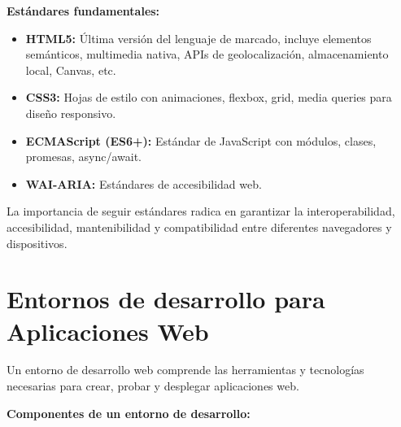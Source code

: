 \documentclass[12pt,letterpaper]{article}
\begin{document}
\textbf{Est\'andares fundamentales:}
\begin{itemize}
    \item \textbf{HTML5:} \'Ultima versi\'on del lenguaje de marcado, incluye elementos sem\'anticos, multimedia nativa, APIs de geolocalizaci\'on, almacenamiento local, Canvas, etc.
    \item \textbf{CSS3:} Hojas de estilo con animaciones, flexbox, grid, media queries para dise\~no responsivo.
    \item \textbf{ECMAScript (ES6+):} Est\'andar de JavaScript con m\'odulos, clases, promesas, async/await.
    \item \textbf{WAI-ARIA:} Est\'andares de accesibilidad web.
\end{itemize}

La importancia de seguir est\'andares radica en garantizar la interoperabilidad, accesibilidad, mantenibilidad y compatibilidad entre diferentes navegadores y dispositivos.

\section{Entornos de desarrollo para Aplicaciones Web}

Un entorno de desarrollo web comprende las herramientas y tecnolog\'ias necesarias para crear, probar y desplegar aplicaciones web.

\textbf{Componentes de un entorno de desarrollo:}
\end{document}
